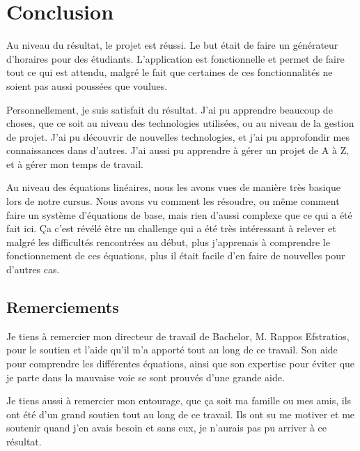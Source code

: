 \section{Conclusion}

Au niveau du résultat, le projet est réussi. Le but était de faire un générateur d'horaires pour des étudiants. L'application est fonctionnelle et permet de faire tout ce qui est attendu, malgré le fait que certaines de ces fonctionnalités ne soient pas aussi poussées que voulues.

Personnellement, je suis satisfait du résultat. J'ai pu apprendre beaucoup de choses, que ce soit au niveau des technologies utilisées, ou au niveau de la gestion de projet. J'ai pu découvrir de nouvelles technologies, et j'ai pu approfondir mes connaissances dans d'autres. J'ai aussi pu apprendre à gérer un projet de A à Z, et à gérer mon temps de travail.

Au niveau des équations linéaires, nous les avons vues de manière très basique lors de notre cursus. Nous avons vu comment les résoudre, ou même comment faire un système d'équations de base, mais rien d'aussi complexe que ce qui a été fait ici. Ça c'est révélé être un challenge qui a été très intéressant à relever et malgré les difficultés rencontrées au début, plus j'apprenais à comprendre le fonctionnement de ces équations, plus il était facile d'en faire de nouvelles pour d'autres cas.

\subsection{Remerciements}

Je tiens à remercier mon directeur de travail de Bachelor, M. Rappos Efstratios, pour le soutien et l'aide qu'il m'a apporté tout au long de ce travail. Son aide pour comprendre les différentes équations, ainsi que son expertise pour éviter que je parte dans la mauvaise voie se sont prouvés d'une grande aide.

Je tiens aussi à remercier mon entourage, que ça soit ma famille ou mes amis, ils ont été d'un grand soutien tout au long de ce travail. Ils ont su me motiver et me soutenir quand j'en avais besoin et sans eux, je n'aurais pas pu arriver à ce résultat.

\vfil
\hspace{8cm}\makeatletter\@author\makeatother\par
\hspace{8cm}\begin{minipage}{5cm}
\printsignature
\end{minipage}
